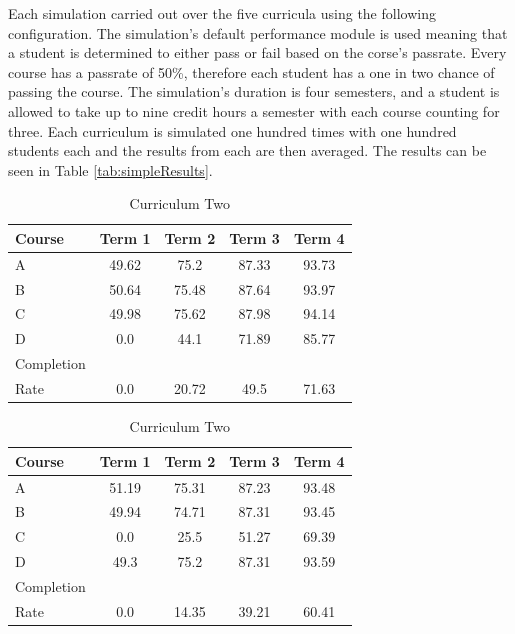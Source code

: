 \documentclass[botnum, fleqn]{unmeethesis}
\begin{document}
Each simulation carried out over the five curricula using the following configuration. The simulation's default performance module is used meaning that a student is determined to either pass or fail based on the corse's passrate. Every course has a passrate of 50\%, therefore each student has a one in two chance of passing the course. The simulation's duration is four semesters, and a student is allowed to take up to nine credit hours a semester with each course counting for three. Each curriculum is simulated one hundred times with one hundred students each and the results from each are then averaged. The results can be seen in Table \ref{tab:simpleResults}.

\begin{table}[!h]
  \tiny
  \caption{}
  \begin{subtable}{0.45\linewidth}
    \centering
      \caption{Curriculum One}
      \label{tab:simple4}
      \begin{tabular}{l*{4}{c}}
        Course  & Term 1 & Term 2 & Term 3 & Term 4 \\
        \hline
        A       & 49.62 & 75.2  & 87.33 & 93.73 \\
        B       & 50.64 & 75.48 & 87.64 & 93.97 \\
        C       & 49.98 & 75.62 & 87.98 & 94.14 \\
        D       & 0.0 & 44.1 & 71.89 & 85.77 \\
        \hline
        Completion \\ Rate & 0.0 & 20.72 & 49.5 & 71.63
      \end{tabular}
  \end{subtable}\hfill
  \begin{subtable}{0.45\linewidth}
    \centering
      \caption{Curriculum Two}
      \label{tab:simple7}
      \begin{tabular}{l*{4}{c}}
        Course  & Term 1 & Term 2 & Term 3 & Term 4 \\
        \hline
        A       & 51.19 & 75.31 & 87.23 & 93.48 \\
        B       & 49.94 & 74.71 & 87.31 & 93.45 \\
        C       & 0.0   & 25.5  & 51.27 & 69.39 \\
        D       & 49.3  & 75.2  & 87.31 & 93.59 \\
        \hline
        Completion \\ Rate & 0.0 & 14.35 & 39.21 & 60.41 \\
      \end{tabular}
  \end{subtable}


\end{table}
\end{document}
